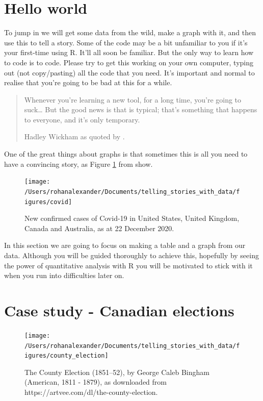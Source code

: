 \documentclass[
]{book}
\begin{document}
\hypertarget{hello-world}{%
\section{Hello world}\label{hello-world}}

To jump in we will get some data from the wild, make a graph with it, and then use this to tell a story. Some of the code may be a bit unfamiliar to you if it's your first-time using R. It'll all soon be familiar. But the only way to learn how to code is to code. Please try to get this working on your own computer, typing out (not copy/pasting) all the code that you need. It's important and normal to realise that you're going to be bad at this for a while.

\begin{quote}
Whenever you're learning a new tool, for a long time, you're going to suck\ldots{} But the good news is that is typical; that's something that happens to everyone, and it's only temporary.

Hadley Wickham as quoted by \citet{citeBarrett}.
\end{quote}

One of the great things about graphs is that sometimes this is all you need to have a convincing story, as Figure \ref{fig:covid} from \citet{ftcoronavirus} show.

\begin{figure}
\texttt{[image: /Users/rohanalexander/Documents/telling\_stories\_with\_data/figures/covid]} \caption{New confirmed cases of Covid-19 in United States, United Kingdom, Canada and Australia, as at 22 December 2020.}\label{fig:covid}
\end{figure}

In this section we are going to focus on making a table and a graph from our data. Although you will be guided thoroughly to achieve this, hopefully by seeing the power of quantitative analysis with R you will be motivated to stick with it when you run into difficulties later on.

\hypertarget{case-study---canadian-elections}{%
\section{Case study - Canadian elections}\label{case-study---canadian-elections}}

\begin{figure}
\texttt{[image: /Users/rohanalexander/Documents/telling\_stories\_with\_data/figures/county\_election]} \caption{The County Election (1851–52), by George Caleb Bingham (American, 1811 - 1879), as downloaded from https://artvee.com/dl/the-county-election.}\label{fig:canadianelections}
\end{figure}
\end{document}
